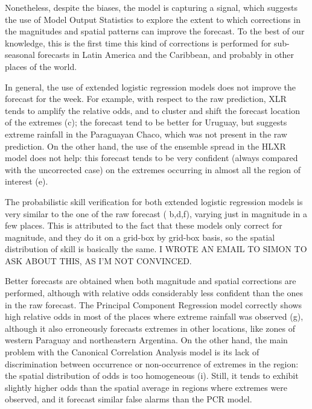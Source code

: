 \documentclass[twocol]{ametsoc}
\begin{document}
Nonetheless, despite the biases, the model is capturing a signal, which suggests the use of Model Output Statistics to explore the extent to which corrections in the magnitudes and spatial patterns can improve the forecast. To the best of our knowledge, this is the first time this kind of corrections is performed for sub-seasonal forecasts in Latin America and the Caribbean, and probably in other places of the world.

In general, the use of extended logistic regression models does not improve the forecast for the week. For example, with respect to the raw prediction, XLR tends to amplify the relative odds, and to cluster and shift the forecast location of the extremes (c); the forecast tend to be better for Uruguay, but suggests extreme rainfall in the Paraguayan Chaco, which was not present in the raw prediction. On the other hand, the use of the ensemble spread in the HLXR model does not help: this forecast tends to be very confident (always compared with the uncorrected case) on the extremes occurring in almost all the region of interest (e).

The probabilistic skill verification for both extended logistic regression models is very similar to the one of the raw forecast ( b,d,f), varying just in magnitude in a few places. This is attributed to the fact that these models only correct for magnitude, and they do it on a grid-box by grid-box basis, so the spatial distribution of skill is basically the same. I WROTE AN EMAIL TO SIMON TO ASK ABOUT THIS, AS I'M NOT CONVINCED.

Better forecasts are obtained when both magnitude and spatial corrections are performed, although with relative odds considerably less confident than the ones in the raw forecast. The Principal Component Regression model correctly shows high relative odds in most of the places where extreme rainfall was observed (g), although it also erroneously forecasts extremes in other locations, like zones of western Paraguay and northeastern Argentina. On the other hand, the main problem with the Canonical Correlation Analysis model is its lack of discrimination between occurrence or non-occurrence of extremes in the region: the spatial distribution of odds is too homogeneous (i). Still, it tends to exhibit slightly higher odds than the spatial average in regions where extremes were observed, and it forecast similar false alarms than the PCR model.
\end{document}
